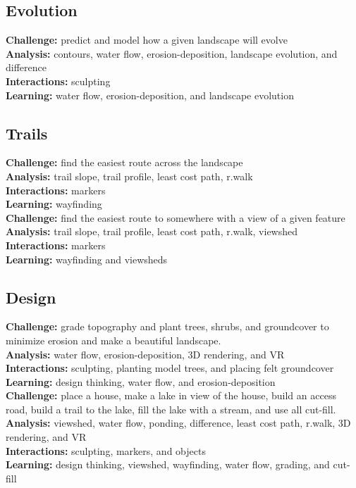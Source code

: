 \documentclass[final,3p,times,twocolumn]{elsarticle}
\begin{document}
\subsection{Evolution}
\noindent
\textbf{Challenge:} predict and model how a given landscape will evolve \\
\textbf{Analysis:} contours, water flow, erosion-deposition, landscape evolution, and difference \\
\textbf{Interactions:} sculpting  \\
\textbf{Learning:} water flow, erosion-deposition, and landscape evolution \\

\subsection{Trails}
\noindent
\textbf{Challenge:} find the easiest route across the landscape\\
\textbf{Analysis:} trail slope, trail profile, least cost path, r.walk \\
\textbf{Interactions:} markers  \\
\textbf{Learning:} wayfinding \\

\noindent
\textbf{Challenge:} find the easiest route to somewhere with a view of a given feature\\
\textbf{Analysis:} trail slope, trail profile, least cost path, r.walk, viewshed \\
\textbf{Interactions:} markers  \\
\textbf{Learning:} wayfinding and viewsheds \\

\subsection{Design}
\noindent
\textbf{Challenge:} grade topography and plant trees, shrubs, and groundcover
to minimize erosion and make a beautiful landscape. \\
\textbf{Analysis:} water flow, erosion-deposition, 3D rendering, and VR \\
\textbf{Interactions:} sculpting, planting model trees, and placing felt groundcover  \\
\textbf{Learning:} design thinking, water flow, and erosion-deposition \\

\noindent
\textbf{Challenge:} place a house, make a lake in view of the house, build an access road, build a trail to the lake, fill the lake with a stream, and use all cut-fill. \\
\textbf{Analysis:} viewshed, water flow, ponding, difference, least cost path, r.walk, 3D rendering, and VR \\
\textbf{Interactions:} sculpting, markers, and objects  \\
\textbf{Learning:} design thinking, viewshed, wayfinding, water flow, grading, and cut-fill \\
\end{document}
